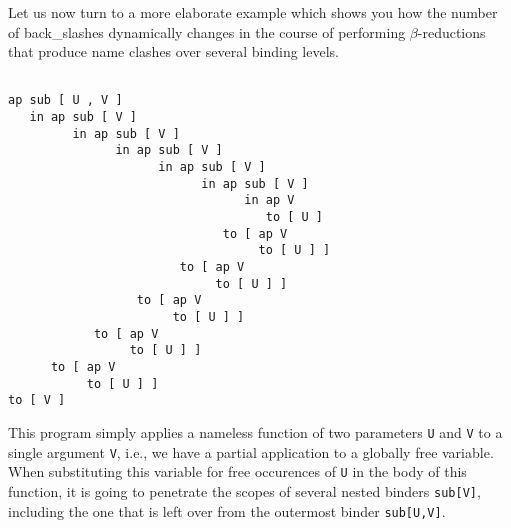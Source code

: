 Let us now turn to a more elaborate example which shows you how the number
of back\_slashes dynamically changes in the course of performing
$\beta$-reductions that produce name clashes over several binding levels.
\begin{verbatim}

ap sub [ U , V ]
   in ap sub [ V ]
         in ap sub [ V ]
               in ap sub [ V ]
                     in ap sub [ V ]
                           in ap sub [ V ]
                                 in ap V
                                    to [ U ]
                              to [ ap V
                                   to [ U ] ]
                        to [ ap V
                             to [ U ] ]
                  to [ ap V
                       to [ U ] ]
            to [ ap V
                 to [ U ] ]
      to [ ap V
           to [ U ] ]
to [ V ]

\end{verbatim}
This program simply applies a nameless function of two parameters
{\tt U} and {\tt V} to a single argument {\tt V}, i.e., we have a {\mys partial
 application} to a {\mys globally free variable}. When substituting this
variable for free occurences of {\tt U} in the body of this function, it
 is going to penetrate the scopes
of several nested binders {\tt sub[V]},
including the one that is left over from the outermost binder {\tt sub[U,V]}. 

